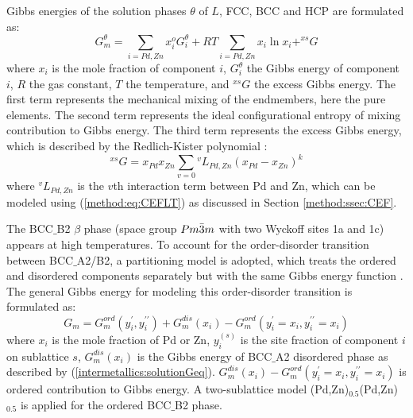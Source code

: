 Gibbs energies of the solution phases $\theta$ of $L$, FCC, BCC and HCP are formulated as:
\begin{equation} \label{intermetallics:solutionGeq}
    G_m^{\theta} = \sum_{i=Pd,Zn}x_i^oG_i^{\theta} + RT\sum_{i=Pd,Zn}x_i\ln x_i + ^{xs}G
\end{equation}
where $x_i$ is the mole fraction of component $i$, $G_i^{\theta}$ the Gibbs energy of component $i$, $R$ the gas constant, $T$ the temperature, and $^{xs}G$ the excess Gibbs energy. The first term represents the mechanical mixing of the endmembers, here the pure elements. The second term represents the ideal configurational entropy of mixing contribution to Gibbs energy. The third term represents the excess Gibbs energy, which is described by the Redlich-Kister polynomial \cite{redlich1948algebraic}:
\begin{equation} \label{intermetallics:solutionRK}
    ^{xs}G = x_{Pd}x_{Zn}\sum_{v=0}{^vL_{Pd,Zn}}(x_{Pd}-x_{Zn})^k
\end{equation}
where $^vL_{Pd,Zn}$ is the $v$th interaction term between Pd and Zn, which can be modeled using (\ref{method:eq:CEFLT}) as discussed in Section \ref{method:ssec:CEF}.

The BCC$\_$B2 $\beta$ phase (space group $Pm\Bar{3}m$ with two Wyckoff sites 1a and 1c) appears at high temperatures. To account for the order-disorder transition between BCC$\_$A2/B2, a partitioning model is adopted, which treats the ordered and disordered components separately but with the same Gibbs energy function \cite{ansara1988thermodynamic, ansara1997reply}. The general Gibbs energy for modeling this order-disorder transition is formulated as:
\begin{equation} \label{intermetallics:disorderG}
    G_m=G_m^{ord}(y_i^\prime,y_i^{\prime\prime})+G_m^{dis}(x_i)-G_m^{ord}(y_i^\prime=x_i, y_i^{\prime\prime}=x_i)
\end{equation}
where $x_i$  is the mole fraction of Pd or Zn, $y_i^{(s)}$ is the site fraction of component $i$ on sublattice $s$, $G_m^{dis}(x_i)$ is the Gibbs energy of BCC$\_$A2 disordered phase as described by (\ref{intermetallics:solutionGeq}). $G_m^{dis}(x_i)-G_m^{ord}(y_i^{\prime}=x_i, y_i^{\prime\prime}=x_i)$ is ordered contribution to Gibbs energy. A two-sublattice model (Pd,Zn)$_{0.5}$(Pd,Zn)$_{0.5}$ is applied for the ordered BCC$\_$B2 phase. 

